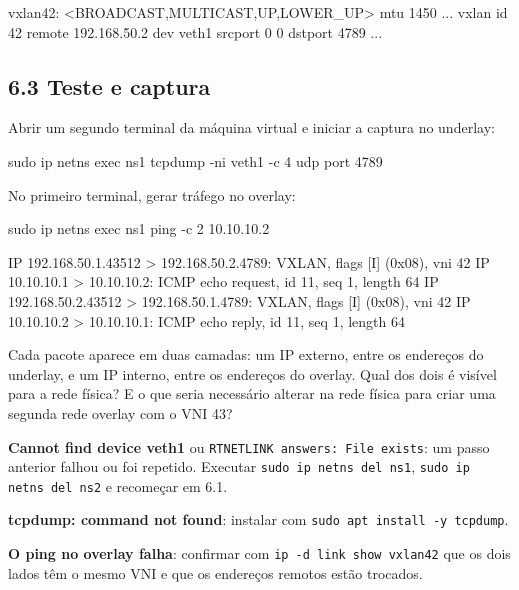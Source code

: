 \documentclass[11pt,a4paper]{article}
\newcommand{\cmd}[1]{\texttt{#1}}
\begin{document}
\begin{saida}
vxlan42: <BROADCAST,MULTICAST,UP,LOWER_UP> mtu 1450 ...
    vxlan id 42 remote 192.168.50.2 dev veth1 srcport 0 0 dstport 4789 ...
\end{saida}

\subsection*{6.3 Teste e captura}

Abrir um segundo terminal da máquina virtual e iniciar a captura no underlay:

\begin{terminal}
sudo ip netns exec ns1 tcpdump -ni veth1 -c 4 udp port 4789
\end{terminal}

No primeiro terminal, gerar tráfego no overlay:

\begin{terminal}
sudo ip netns exec ns1 ping -c 2 10.10.10.2
\end{terminal}

\begin{saida}
IP 192.168.50.1.43512 > 192.168.50.2.4789: VXLAN, flags [I] (0x08), vni 42
IP 10.10.10.1 > 10.10.10.2: ICMP echo request, id 11, seq 1, length 64
IP 192.168.50.2.43512 > 192.168.50.1.4789: VXLAN, flags [I] (0x08), vni 42
IP 10.10.10.2 > 10.10.10.1: ICMP echo reply, id 11, seq 1, length 64
\end{saida}

\begin{observe}
Cada pacote aparece em duas camadas: um IP externo, entre os endereços do underlay, e um IP interno, entre os endereços do overlay. Qual dos dois é visível para a rede física? E o que seria necessário alterar na rede física para criar uma segunda rede overlay com o VNI 43?
\end{observe}

\begin{erro}
\textbf{Cannot find device veth1} ou \cmd{RTNETLINK answers: File exists}: um passo anterior falhou ou foi repetido. Executar \cmd{sudo ip netns del ns1}, \cmd{sudo ip netns del ns2} e recomeçar em 6.1.

\textbf{tcpdump: command not found}: instalar com \cmd{sudo apt install -y tcpdump}.

\textbf{O ping no overlay falha}: confirmar com \cmd{ip -d link show vxlan42} que os dois lados têm o mesmo VNI e que os endereços remotos estão trocados.
\end{erro}
\end{document}
